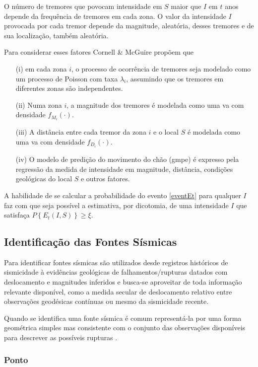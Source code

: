 O número de tremores que povocam intensidade em $S$ maior que $I$ em $t$ anos depende da frequência
de tremores em cada zona. O valor da intensidade $I$ provocada por cada tremor depende da magnitude,
aleatória, desses tremores e de sua localização, também aleatória.

Para considerar esses fatores Cornell \& McGuire propõem que
\begin{itemize}
\item[(i)] em cada zona $i$, o processo de ocorrência de tremores seja 
modelado como um processo de Poisson com taxa $\lambda_i$, assumindo que os tremores em diferentes zonas são
independentes.
\item[(ii)] Numa zona $i$, a magnitude dos tremores é modelada como uma \gls{va}
com densidade $f_{M_i}(\cdot)$.
\item[(iii)] A distância entre cada tremor da zona $i$ e o local $S$ é modelada como uma \gls{va}
com densidade $f_{D_i}(\cdot)$.
\item[(iv)] O modelo de predição do movimento do chão (\gls{gmpe}) é expresso pela regressão da medida de intensidade
em magnitude, distância, condições geológicas do local $S$ e outros fatores.
\end{itemize}


A habilidade de se calcular a probabilidade do evento
\eqref{eventEt} para qualquer $I$ faz com que seja possível a estimativa, por dicotomia, de uma intensidade $I$ que satisfaça
$P\left\{ E_t(I, S) \right\} \geq \xi$.


\subsection{Identificação das Fontes Sísmicas}
Para identificar fontes sísmicas são utilizados desde registros históricos de sismicidade à evidências geológicas de
falhamentos/rupturas datados com deslocamento e magnitudes inferidos e busca-se aproveitar de toda informação relevante
disponível, como a medida secular de deslocamento relativo entre observações geodésicas contínuas ou mesmo da
sismicidade recente.

Quando se identifica uma fonte sísmica é comum representá-la por uma forma geométrica simples mas consistente com o
conjunto das observações disponíveis para descrever as possíveis rupturas \citep{crowley_2013}. 

\subsubsection{Ponto}
\label{sec:point_source}

